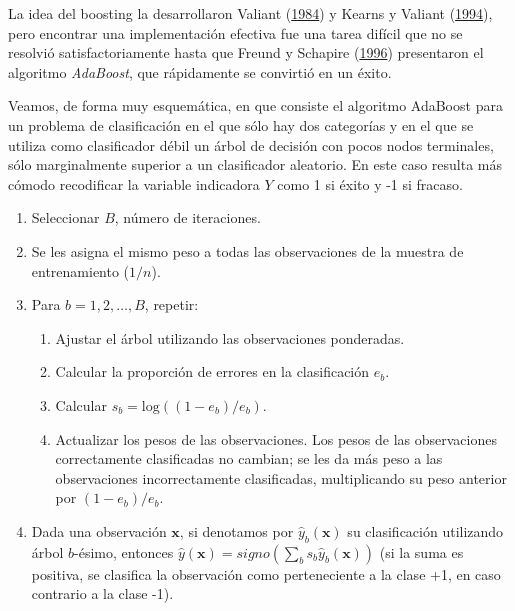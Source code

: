 \documentclass[
]{book}
\theoremstyle{break}
\theoremstyle{nonumberplain}
\begin{document}
La idea del boosting la desarrollaron Valiant (\protect\hyperlink{ref-valiant1984theory}{1984}) y Kearns y Valiant (\protect\hyperlink{ref-kearns_cryptographic_1994}{1994}), pero encontrar una implementación efectiva fue una tarea difícil que no se resolvió satisfactoriamente hasta que Freund y Schapire (\protect\hyperlink{ref-freund1996schapire}{1996}) presentaron el algoritmo \emph{AdaBoost}, que rápidamente se convirtió en un éxito.

Veamos, de forma muy esquemática, en que consiste el algoritmo AdaBoost para un problema de clasificación en el que sólo hay dos categorías y en el que se utiliza como clasificador débil un árbol de decisión con pocos nodos terminales, sólo marginalmente superior a un clasificador aleatorio.
En este caso resulta más cómodo recodificar la variable indicadora \(Y\) como 1 si éxito y -1 si fracaso.

\begin{enumerate}
\def\labelenumi{\arabic{enumi}.}
\item
  Seleccionar \(B\), número de iteraciones.
\item
  Se les asigna el mismo peso a todas las observaciones de la muestra de entrenamiento (\(1/n\)).
\item
  Para \(b = 1, 2,\ldots, B\), repetir:

  \begin{enumerate}
  \def\labelenumii{\alph{enumii}.}
  \item
    Ajustar el árbol utilizando las observaciones ponderadas.
  \item
    Calcular la proporción de errores en la clasificación \(e_b\).
  \item
    Calcular \(s_b = \text{log}((1 - e_b)/e_b)\).
  \item
    Actualizar los pesos de las observaciones. Los pesos de las observaciones correctamente clasificadas no cambian; se les da más peso a las observaciones incorrectamente clasificadas, multiplicando su peso anterior por \((1 - e_b)/e_b\).
  \end{enumerate}
\item
  Dada una observación \(\mathbf{x}\), si denotamos por \(\hat y_b ( \mathbf{x} )\) su clasificación utilizando árbol \(b\)-ésimo, entonces \(\hat y( \mathbf{x} ) = signo \left( \sum_b s_b \hat y_b ( \mathbf{x} ) \right)\) (si la suma es positiva, se clasifica la observación como perteneciente a la clase +1, en caso contrario a la clase -1).
\end{enumerate}
\end{document}
